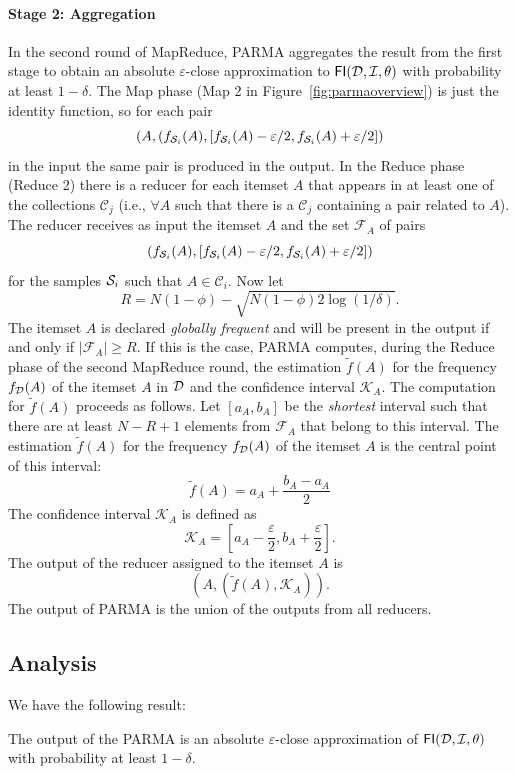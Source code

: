\paragraph*{Stage 2: Aggregation} In the second round of MapReduce, PARMA
aggregates the result from the first stage to obtain an absolute
$\varepsilon$-close approximation to $\mathsf{FI}({\cal D},{\cal I},\theta)$ with probability at least
$1-\delta$. The Map phase (Map 2 in Figure~\ref{fig:parmaoverview}) is just the identity
function, so for each pair 
\[(A,
(f_{{\cal S}_i}(A),[f_{{\cal S}_i}(A)-\varepsilon/2,f_{{\cal S}_i}(A)+\varepsilon/2])\]
in the input the same pair is produced in the output. In the Reduce phase (Reduce 2) there
is a reducer for each itemset $A$ that appears in at least one of the
collections $\mathcal{C}_j$ (i.e., $\forall A$ such that there is a
$\mathcal{C}_j$ containing a pair related to $A$). The reducer receives as input
the itemset $A$ and the set $\mathcal{F}_A$ of pairs
\[
(f_{{\cal S}_i}(A),[f_{{\cal S}_i}(A)-\varepsilon/2,f_{{\cal S}_i}(A)+\varepsilon/2])\]
for the samples ${\cal S}_i$ such that $A\in\mathcal{C}_i$.
Now let
\begin{equation}\label{eq:parmaRdef}
R = N(1-\phi)-\sqrt{N(1-\phi)2\log(1/\delta)}.
\end{equation}
The itemset $A$ is declared
\emph{globally frequent} and will be present in the output if and only if
$|\mathcal{F}_A| \ge R$. If this is the case, PARMA computes, during the Reduce
phase of the second MapReduce round, the estimation $\tilde{f}(A)$ for the
frequency $f_{\cal D}(A)$ of the itemset $A$ in ${\cal D}$ and the confidence interval
$\mathcal{K}_A$. The computation for $\tilde{f}(A)$ proceeds as follows. Let
$[a_A,b_A]$ be the \emph{shortest} interval such that
there are at least $N-R+1$ elements from $\mathcal{F}_A$ that belong to this
interval. The estimation $\tilde{f}(A)$ for the frequency $f_{\cal D}(A)$ of the
itemset $A$ is the central point of this interval:
\[ \tilde{f}(A)=a_A+\frac{b_A-a_A}{2}\]
The confidence interval $\mathcal{K}_A$ is defined as
\[ \mathcal{K}_A=\left[a_A-\frac{\varepsilon}{2},b_A+\frac{\varepsilon}{2}\right].\]
The output of the reducer assigned to the itemset $A$ is \[(A,(\tilde{f}(A),\mathcal{K}_A)).\]
The output of PARMA is the union of the outputs from all reducers.

\subsection{Analysis}
We have the following result:
\begin{lemma}\label{lem:multiepsapprox}
 The output of the PARMA is an absolute $\varepsilon$-close approximation of
 $\mathsf{FI}({\cal D},{\cal I},\theta)$ with probability at least $1-\delta$.
\end{lemma}


